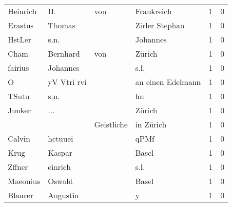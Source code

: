 \begin{tabular}{llllrr}
                 Heinrich &                                II. &         von &                                  Frankreich &          1 &         0 \\
                  Erastus &                             Thomas &             &                              Zirler Stephan &          1 &         0 \\
                   HstLer &                               s.n. &             &                                    Johannes &          1 &         0 \\
                     Cham &                           Bernhard &         von &                                      Zürich &          1 &         0 \\
                  fairius &                           Johannes &             &                                        s.l. &          1 &         0 \\
                        O &                        yV Vtri rvi &             &                           an einen Edelmann &          1 &         0 \\
                    TSutu &                               s.n. &             &                                          hn &          1 &         0 \\
                   Junker &                                ... &             &                                      Zürich &          1 &         0 \\
                          &                                    &  Geistliche &                                   in Zürich &          1 &         0 \\
                   Calvin &                            hctuuei &             &                                        qPMf &          1 &         0 \\
                     Krug &                             Kaspar &             &                                       Basel &          1 &         0 \\
                   Zffner &                            einrich &             &                                        s.l. &          1 &         0 \\
                 Maeonius &                             Oswald &             &                                       Basel &          1 &         0 \\
                  Blaurer &                           Augustin &             &                                           y &          1 &         0 \\

\end{tabular}
